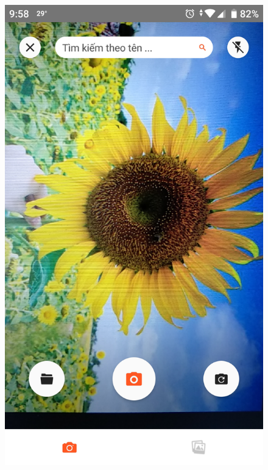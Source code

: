 \documentclass[12pt]{report}
\begin{document}
		\begin{figure}[h]
			\centering
			\includegraphics[scale=0.2]{app_search1}

\end{figure}
\end{document}
